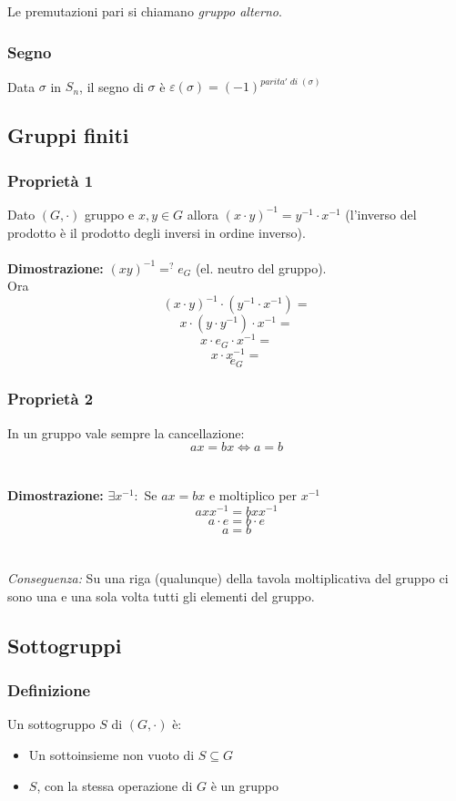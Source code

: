 Le premutazioni pari si chiamano \textit{gruppo alterno}.

\subsubsection{Segno}

Data \(\sigma\) in \(S_n\), il segno di \(\sigma\) è \(\varepsilon (\sigma)=(-1)^{parita'\;di\;(\sigma)}\)

\subsection{Gruppi finiti}

\subsubsection{Proprietà 1}

Dato \((G,\cdot)\) gruppo e \(x,y\in G\) allora \((x\cdot y)^{-1}=y^{-1}\cdot x^{-1}\) (l'inverso del prodotto è il prodotto degli inversi in ordine inverso).
\\\\
\textbf{Dimostrazione:} \((xy)^{-1}=^? e_G\) (el. neutro del gruppo).
\\Ora 
\[(x\cdot y)^{-1}\cdot (y^{-1}\cdot x^{-1})=\]
\[x\cdot (y\cdot y^{-1})\cdot x^{-1}=\]
\[x\cdot e_G\cdot x^{-1}=\]
\[x\cdot x^{-1}=\]
\[e_G\]

\subsubsection{Proprietà 2}
In un gruppo vale sempre la cancellazione:
\[ax=bx\Leftrightarrow a=b\]
\\\\
\textbf{Dimostrazione:} \(\exists x^{-1}:\) Se \(ax=bx\) e moltiplico per \(x^{-1}\)
\[axx^{-1}=bxx^{-1}\]
\[a\cdot e=b\cdot e\]
\[a=b\]
\\\\\textit{Conseguenza:} Su una riga (qualunque) della tavola moltiplicativa del gruppo ci sono una e una sola volta tutti gli elementi del gruppo.

\subsection{Sottogruppi}

\subsubsection{Definizione}
Un sottogruppo \(S\) di \((G,\cdot)\) è:
\begin{itemize}
	\item Un sottoinsieme non vuoto di \(S\subseteq G\)
	\item \(S\), con la stessa operazione di \(G\) è un gruppo
\end{itemize}

